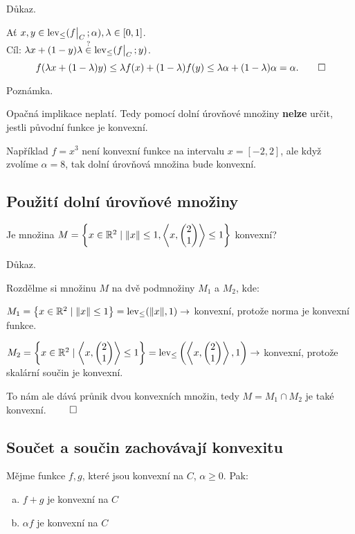 Důkaz.

Ať $x, y \in \lev_{\leq}(\restr{f}{C}; \alpha), \lambda \in [0,1]$.\\
Cíl: $\lambda x + (1-y)\lambda \stackrel{?}{\in} \lev_{\leq} (\restr{f}{C}; y)$.
\[
    f(\lambda x + (1-\lambda)y) \leq \lambda f(x) + (1-\lambda) f(y) \leq \lambda \alpha + (1-\lambda) \alpha = \alpha. \qed
\]

Poznámka.

Opačná implikace neplatí. Tedy pomocí dolní úrovňové množiny \textbf{nelze} určit, jestli původní funkce je konvexní.

Například $f = x^3$ není konvexní funkce na intervalu $x = [-2, 2]$, ale když zvolíme $\alpha = 8$, tak dolní úrovňová 
množina bude konvexní. %

\subsection{Použití dolní úrovňové množiny}
Je množina $M = \left\lbrace x \in \mathbb{R}^2 \mid \| x\| \leq 1, \left\langle x, 
\begin{pmatrix}
    2 \\
    1
\end{pmatrix}
\right\rangle \leq 1 \right\rbrace$ konvexní?

Důkaz.

Rozdělme si množinu $M$ na dvě podmnožiny $M_1$ a $M_2$, kde:

$M_1 = \left\lbrace x \in \mathbb{R}^2 \mid \| x\| \leq 1 \right\rbrace = \operatorname*{lev}_{\leq} (\| x\|, 1) \rightarrow$ konvexní, protože norma je konvexní funkce.

$M_2 = \left\lbrace x \in \mathbb{R}^2 \mid \left\langle x, 
\begin{pmatrix}
    2 \\
    1
\end{pmatrix}
\right\rangle \leq 1 \right\rbrace = \operatorname*{lev}_{\leq} \left(\left\langle x, 
\begin{pmatrix}
    2 \\
    1
\end{pmatrix}
\right\rangle, 1\right) \rightarrow$ konvexní, protože skalární součin je konvexní.

To nám ale dává průnik dvou konvexních množin, tedy $M = M_1 \cap M_2$ je také konvexní. $\qed$

\newpage
\subsection{Součet a součin zachovávají konvexitu}\label{ssKonv}
Mějme funkce $f, g$, které jsou konvexní na $C$, $\alpha \geq 0$. Pak:
\begin{enumerate}[(a)]
    \item $f+g$ je konvexní na $C$
    \item $\alpha f$ je konvexní na $C$
\end{enumerate}

